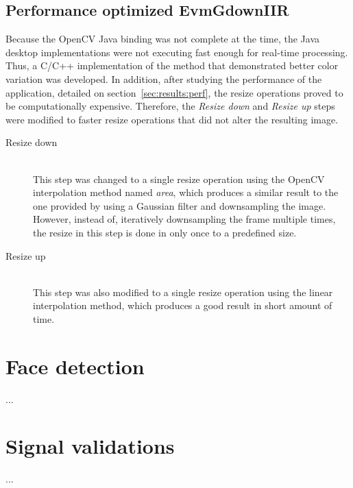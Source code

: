 \subsection{Performance optimized EvmGdownIIR} \label{sec:impl:evm:final}

Because the OpenCV Java binding was not complete at the time, the Java desktop
implementations were not executing fast enough for real-time processing. Thus,
a C/C++ implementation of the method that demonstrated better color variation
was developed. In addition, after studying the performance of the application,
detailed on section~\ref{sec:results:perf}, the resize operations proved to be
computationally expensive. Therefore, the \emph{Resize down} and
\emph{Resize up} steps were modified to faster resize operations that did not
alter the resulting image.

\begin{description}
  \item[Resize down]\hfill\\
        This step was changed to a single resize operation using the
        OpenCV interpolation method named \emph{area}, which produces a similar
        result to the one provided by using a Gaussian filter and downsampling
        the image.
        However, instead of, iteratively downsampling the frame multiple times,
        the resize in this step is done in only once to a predefined size.

  \item[Resize up]\hfill\\
        This step was also modified to a single resize operation using the
        linear interpolation method, which produces a good result in short
        amount of time.
\end{description}

\section{Face detection} \label{sec:impl:face}

...

\section{Signal validations} \label{sec:impl:validations}

...

